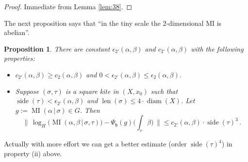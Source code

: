 \documentclass[10pt, a4paper]{amsart}
\newtheorem{prop}[equation]{Proposition}
\theoremstyle{definition}
\numberwithin{equation}{section}
\newcommand{\opn}{\operatorname}
\newcommand{\rmitem}[1]{\item[\text{\textup{(#1)}}]}
\newcommand{\mfrak}[1]{\mathfrak{#1}}
\newcommand{\Norm}[1]{\bigl\lVert\, #1 \, \bigr\rVert}
\renewcommand{\vert}{\, | \,}
\newcommand{\h}{\mfrak{h}}
\begin{document}
\begin{proof}
Immediate from Lemma \ref{lem:38}.
\end{proof}

The next proposition says that ``in the tiny scale the $2$-dimensional MI is
abelian''. 

\begin{prop} \label{prop:22}
There are constant $\epsilon_{2'}(\alpha, \beta)$ and
$c_{2'}(\alpha, \beta)$ with the following properties:
\begin{itemize}
\rmitem{i} $c_{2'}(\alpha, \beta) \geq c_2(\alpha, \beta)$ and
$0 < \epsilon_{2'}(\alpha, \beta) \leq \epsilon_2(\alpha, \beta)$.
%
\rmitem{ii} Suppose $(\sigma, \tau)$ is a square kite in $(X, x_0)$ such that 
$\opn{side}(\tau) < \epsilon_{2'}(\alpha, \beta)$
and
$\opn{len}(\sigma) \leq 4 \cdot \opn{diam}(X)$. 
Let
$g := \opn{MI}(\alpha \vert \sigma) \in G$.
Then 
\[ \Norm{ \opn{log}_H \bigl( \opn{MI}(\alpha, \beta \vert \sigma, \tau)
\bigr) -
\Psi_{\h}(g)\bigl( \int_{\tau} \beta \bigr)  } \leq 
c_{2'}(\alpha, \beta) \cdot \opn{side}(\tau)^3 \, .  \]
\end{itemize}
\end{prop}

Actually with more effort we can get a better estimate (order 
$\opn{side}(\tau)^4$) in property (ii) above. 
\end{document}
